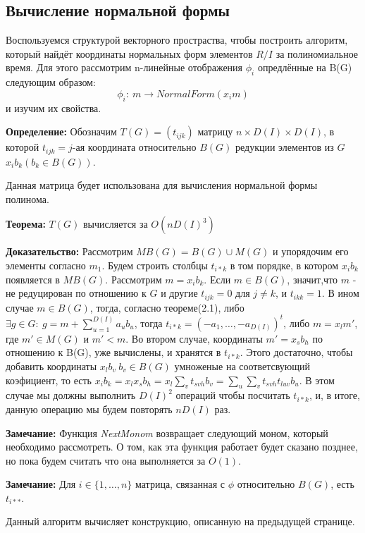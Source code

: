 \documentclass{article}
\begin{document}
    \subsection{Вычисление нормальной формы}
    Воспользуемся структурой векторного простраства, чтобы построить алгоритм, который найдёт координаты нормальных форм 
    элементов $R/I$ за полиномиальное время. Для этого рассмотрим n-линейные отображения $\phi_i$  опредлённые на B(G) следующим образом:
    $$\phi_i:\:m\rightarrow NormalForm(x_im)$$
    и изучим их свойства.

    \textbf{Определение:}  Обозначим $T(G) = (t_{ijk})$ матрицу $n \times D(I) \times D(I)$, в которой
            $t_{ijk}=j$-ая координата относительно $B(G)$ редукции элементов из $G$ $x_ib_k (b_k \in B(G))$.
 
    Данная матрица будет использована для вычисления нормальной формы полинома.
    
    \textbf{Теорема:} $T(G)$ вычисляется за $O(nD(I)^3)$

    \textbf{Доказательство:} Рассмотрим $MB(G) = B(G) \cup M(G)$ и упорядочим его элементы согласно $m_1$. Будем строить столбцы
    $t_{i*k}$ в том порядке, в котором $x_ib_k$ появляется в $MB(G)$. Рассмотрим $m=x_ib_k$. Если $m \in B(G)$, значит,что $m$ - не 
    редуцирован по отношению к $G$ и другие $t_{ijk} = 0$ для $j \neq k$, и $t_{ikk}=1$. В ином случае $m \in B(G)$, тогда, согласно теореме(2.1), 
    либо $\exists g \in G:\: g=m+\sum_{u=1}^{D(I)} a_ub_u$, тогда $t_{i*k}=(-a_1,\ldots, -a_{D(I)})^t$, либо
    $m=x_lm'$, где $m'\in M(G)$ и $m' < m$. Во втором случае, координаты $m'=x_sb_h$ по отношению к B(G), уже вычислены, и хранятся в $t_{i*k}$. 
    Этого достаточно, чтобы добавить координаты $x_lb_v \: b_v \in B(G)$ умноженые на соответсвующий коэфициент, то есть
    $x_ib_k = x_lx_sb_h = x_l\sum_{v} {t_{svh}b_v}=\sum_u\sum_v{t_{svh}t_{luv}b_u}$. В этом случае мы должны выполнить $D(I)^2$ операций
    чтобы посчитать $t_{i*k}$, и, в итоге, данную операцию мы будем повторять $nD(I)$ раз.

    \textbf{Замечание:} Функция \textit{NextMonom} возвращает следующий моном, который необходимо рассмотреть. О том, как эта функция
    работает будет сказано позднее, но пока будем считать что она выполняется за $O(1)$. 

    \textbf{Замечание:} Для $i \in \{1,\ldots, n\}$ матрица, связанная с $\phi$ относительно $B(G)$, есть $t_{i**}$.
 
    \newpage 
    Данный алгоритм вычисляет конструкцию, описанную на предыдущей странице.
\end{document}
